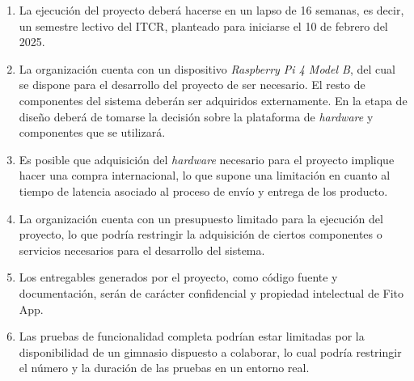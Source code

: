 \begin{enumerate}
    \item La ejecución del proyecto deberá hacerse en un lapso de 16 semanas, es decir, un semestre lectivo del ITCR, planteado para iniciarse el 10 de febrero del 2025.
    \item La organización cuenta con un dispositivo \textit{Raspberry Pi 4 Model B}, del cual se dispone para el desarrollo del proyecto de ser necesario. El resto de componentes del sistema deberán ser adquiridos externamente. En la etapa de diseño deberá de tomarse la decisión sobre la plataforma de \textit{hardware} y componentes que se utilizará.
    \item Es posible que adquisición del \textit{hardware} necesario para el proyecto implique hacer una compra internacional, lo que supone una limitación en cuanto al tiempo de latencia asociado al proceso de envío y entrega de los producto.
    \item La organización cuenta con un presupuesto limitado para la ejecución del proyecto, lo que podría restringir la adquisición de ciertos componentes o servicios necesarios para el desarrollo del sistema.
    \item Los entregables generados por el proyecto, como código fuente y documentación, serán de carácter confidencial y propiedad intelectual de Fito App.
    \item Las pruebas de funcionalidad completa podrían estar limitadas por la disponibilidad de un gimnasio dispuesto a colaborar, lo cual podría restringir el número y la duración de las pruebas en un entorno real.
\end{enumerate}



